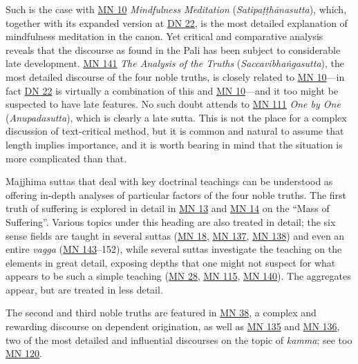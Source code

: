 \documentclass[12pt,openany]{book}%
\begin{document}
Such is the case with \href{https://suttacentral.net/mn10}{MN 10} \textit{Mindfulness Meditation} (\textit{\textsanskrit{Satipaṭṭhānasutta}}), which, together with its expanded version at \href{https://suttacentral.net/dn22}{DN 22}, is the most detailed explanation of mindfulness meditation in the canon. Yet critical and comparative analysis reveals that the discourse as found in the Pali has been subject to considerable late development. \href{https://suttacentral.net/mn141}{MN 141} \textit{The Analysis of the Truths} (\textit{\textsanskrit{Saccavibhaṅgasutta}}), the most detailed discourse of the four noble truths, is closely related to \href{https://suttacentral.net/mn10}{MN 10}—in fact \href{https://suttacentral.net/dn22}{DN 22} is virtually a combination of this and \href{https://suttacentral.net/mn10}{MN 10}—and it too might be suspected to have late features. No such doubt attends to \href{https://suttacentral.net/mn111}{MN 111} \textit{One by One} (\textit{Anupadasutta}), which is clearly a late sutta. This is not the place for a complex discussion of text-critical method, but it is common and natural to assume that length implies importance, and it is worth bearing in mind that the situation is more complicated than that.

Majjhima suttas that deal with key doctrinal teachings can be understood as offering in-depth analyses of particular factors of the four noble truths. The first truth of suffering is explored in detail in \href{https://suttacentral.net/mn13}{MN 13} and \href{https://suttacentral.net/mn14}{MN 14} on the “Mass of Suffering”. Various topics under this heading are also treated in detail; the six sense fields are taught in several suttas (\href{https://suttacentral.net/mn18}{MN 18}, \href{https://suttacentral.net/mn137}{MN 137}, \href{https://suttacentral.net/mn138}{MN 138}) and even an entire \textit{vagga} (\href{https://suttacentral.net/mn143}{MN 143}–152), while several suttas investigate the teaching on the elements in great detail, exposing depths that one might not suspect for what appears to be such a simple teaching (\href{https://suttacentral.net/mn28}{MN 28}, \href{https://suttacentral.net/mn115}{MN 115}, \href{https://suttacentral.net/mn140}{MN 140}). The aggregates appear, but are treated in less detail.

The second and third noble truths are featured in \href{https://suttacentral.net/mn38}{MN 38}, a complex and rewarding discourse on dependent origination, as well as \href{https://suttacentral.net/mn135}{MN 135} and \href{https://suttacentral.net/mn136}{MN 136}, two of the most detailed and influential discourses on the topic of \textit{kamma}; see too \href{https://suttacentral.net/mn120}{MN 120}.
\end{document}
